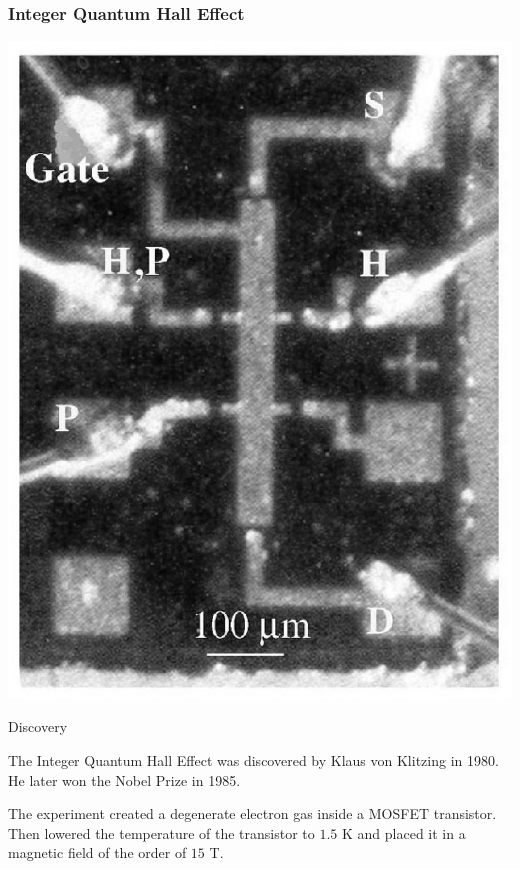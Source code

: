 \documentclass{beamer}
\begin{document}
\begin{frame}
\frametitle{Integer Quantum Hall Effect}
\begin{center}
\includegraphics[scale=0.18]{QHEKlitz2.eps}
\end{center}
\begin{block}
{Discovery}
\begin{itemize}
\footnotesize{
\item The Integer Quantum Hall Effect was discovered by Klaus von Klitzing in 1980. He later won the Nobel Prize in 1985.
\item The experiment created a degenerate electron gas inside a MOSFET transistor. Then lowered the temperature of the transistor to $1.5$ K and placed it in a magnetic field of the order of $15$ T.
}
\end{itemize}
\end{block}
\end{frame}
\end{document}
